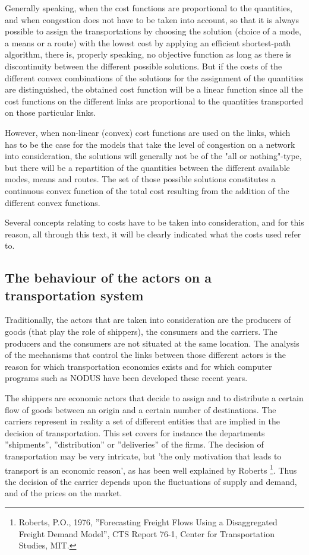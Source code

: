 Generally speaking, when the cost functions are proportional to the quantities,
and when congestion does not have to be taken into account, so that it is always
possible to assign the transportations by choosing the solution (choice of a
mode, a means or a route) with the lowest cost by applying an efficient
shortest-path algorithm, there is, properly speaking, no objective function as
long as there is discontinuity between the different possible solutions. But if
the costs of the different convex combinations of the solutions for the
assignment of the quantities are distinguished, the obtained cost function will
be a linear function since all the cost functions on the different links are
proportional to the quantities transported on those particular links.

However, when non-linear (convex) cost functions are used on the links, which
has to be the case for the models that take the level of congestion on a network
into consideration, the solutions will generally not be of the "all or
nothing"-type, but there will be a repartition of the quantities between the
different available modes, means and routes. The set of those possible solutions
constitutes a continuous convex function of the total cost resulting from the
addition of the different convex functions.

Several concepts relating to costs have to be taken into consideration, and for
this reason, all through this text, it will be clearly indicated what the costs
used refer to.


\subsection{The behaviour of the actors on a transportation system}

Traditionally, the actors that are taken into consideration are the producers of
goods (that play the role of shippers), the consumers and the carriers. The
producers and the consumers are not situated at the same location.  The analysis
of the mechanisms that control the links between those different actors is the
reason for which transportation economics exists and for which computer programs
such as NODUS have been developed these recent years.

The shippers are economic actors that decide to assign and to distribute a
certain flow of goods between an origin and a certain number of destinations.
The carriers represent in reality a set of different entities that are implied
in the decision of transportation.  This set covers for instance the departments
''shipments'', ''distribution'' or ''deliveries'' of the firms.  The decision of
transportation may be very intricate, but 'the only motivation that leads to
transport is an economic reason', as has been well explained by Roberts
\footnote{Roberts, P.O., 1976, ''Forecasting Freight Flows Using a Disaggregated
Freight Demand Model'', CTS Report 76-1, Center for Transportation Studies,
MIT.}.  Thus the decision of the carrier depends upon the fluctuations of supply
and demand, and of the prices on the market.


